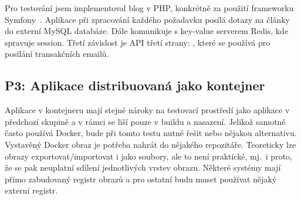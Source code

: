         Pro testování jsem implementoval blog v PHP, konkrétně za použití frameworku Symfony~\cite{symfony}. Aplikace při zpracování každého požadavku posílá dotazy na články do externí MySQL databáze. Dále komunikuje s key-value serverem Redis, kde spravuje session. Třetí závislost je API třetí strany: , které se používá pro posílání transakčních emailů.

    \subsection{P3: Aplikace distribuovaná jako kontejner}
        Aplikace v kontejneru mají stejné nároky na testovací prostředí jako aplikace v předchozí skupině a v rámci \CICD se liší pouze v buildu a nasazení. Jelikož samotné \CI často používá Docker, bude při tomto testu nutné řešit  nebo nějakou alternativu. Vystavěný Docker obraz je potřeba nahrát do nějakého repozitáře. Teoreticky lze obrazy exportovat/importovat i jako soubory, ale to není praktické, mj.~i proto, že se pak neuplatní sdílení jednotlivých vrstev obrazu. Některé systémy mají přímo zabudovaný registr obrazů a pro ostatní budu muset používat nějaký externí registr.
